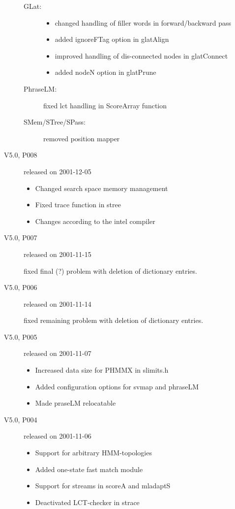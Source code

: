 \documentclass[a4paper,twoside]{book}
\begin{document}
\begin{description}
  \begin{description}
  \item[GLat:]
    \begin{itemize}
    \item changed handling of filler words in forward/backward pass
    \item added ignoreFTag option in glatAlign
    \item improved handling of dis-connected nodes in glatConnect
    \item added nodeN option in glatPrune
    \end{itemize}
  \item[PhraseLM:] fixed lct handling in ScoreArray function
  \item[SMem/STree/SPass:] removed position mapper
  \end{description}

\item[V5.0, P008] released on 2001-12-05

  \begin{itemize}
  \item Changed search space memory management
  \item Fixed trace function in stree
  \item Changes according to the intel compiler
  \end{itemize}

\item[V5.0, P007] released on 2001-11-15

  fixed final (?) problem with deletion of dictionary entries.

\item[V5.0, P006] released on 2001-11-14

  fixed remaining problem with deletion of dictionary entries.

\item[V5.0, P005] released on 2001-11-07

  \begin{itemize}
  \item Increased data size for PHMMX in slimits.h
  \item Added configuration options for svmap and phraseLM
  \item Made praseLM relocatable
  \end{itemize}

\item[V5.0, P004] released on 2001-11-06

  \begin{itemize}
  \item Support for arbitrary HMM-topologies
  \item Added one-state fast match module
  \item Support for streams in scoreA and mladaptS
  \item Deactivated LCT-checker in strace
  \end{itemize}


\end{description}
\end{document}
